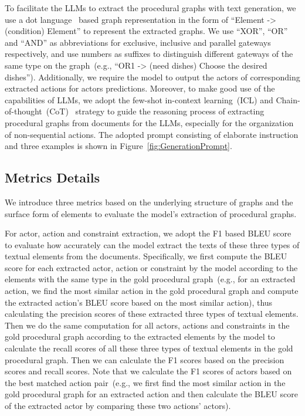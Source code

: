 To facilitate the LLMs to extract the procedural graphs with text generation,
we use a dot language~\cite{gansner2006drawing} based graph representation in the form of ``Element -> (condition) Element'' to represent the extracted graphs. We use ``XOR'', ``OR'' and ``AND'' as abbreviations for exclusive, inclusive and parallel gateways respectively, and use numbers as suffixes to distinguish different gateways of the same type on the graph~(e.g., ``OR1 -> (need dishes) Choose the desired dishes'').
Additionally, we require the model to output the actors of corresponding extracted actions for actors predictions.
Moreover, to make good use of the capabilities of LLMs, we adopt the few-shot in-context learning~(ICL) and Chain-of-thought~(CoT)~\cite{wei2022chain} strategy to guide the reasoning process of extracting procedural graphs from documents for the LLMs, especially for the organization of non-sequential actions. The adopted prompt consisting of elaborate instruction and three examples is shown in Figure~\ref{fig:GenerationPrompt}.


\subsection{Metrics Details
}

We introduce three metrics based on the underlying structure of graphs and the surface form of elements to evaluate the model's extraction of procedural graphs.

For actor, action and constraint extraction, we adopt the F1 based BLEU score~\cite{liang2023knowing} to evaluate how accurately can the model extract the texts of these three types of textual elements from the documents. Specifically, we first compute the BLEU score for each extracted actor, action or constraint by the model according to the elements with the same type in the gold procedural graph~(e.g., for an extracted action, we find the most similar action in the gold procedural graph and compute the extracted action's BLEU score based on the most similar action), thus calculating the precision scores of these extracted three types of textual elements. Then we do the same computation for all actors, actions and constraints in the gold procedural graph according to the extracted elements by the model to calculate the recall scores of all these three types of textual elements in the gold procedural graph. Then we can calculate the F1 scores based on the precision scores and recall scores. Note that we calculate the F1 scores of actors based on the best matched action pair~(e.g., we first find the most similar action in the gold procedural graph for an extracted action and then calculate the BLEU score of the extracted actor by comparing these two actions' actors).

